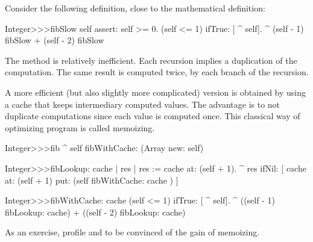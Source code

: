 \documentclass[a4paper,10pt,twoside]{book}
\begin{document}
Consider the following definition, close to the mathematical definition:
\begin{code}{}
Integer>>>fibSlow
	self assert: self >= 0.
	(self <= 1) ifTrue: [ ^ self].
	^ (self - 1) fibSlow + (self - 2) fibSlow
\end{code}

The method  is relatively inefficient. Each recursion implies a duplication of the computation. The same result is computed twice, by each branch of the recursion.

A more efficient (but also slightly more complicated) version is obtained by using a cache that keeps intermediary computed values. The advantage is to not duplicate computations since each value is computed once. This classical way of optimizing program is called memoizing. 
      
\begin{code}{}
Integer>>>fib
	^ self fibWithCache: (Array new: self)

Integer>>>fibLookup: cache
	| res |
	res := cache at: (self + 1).
	^ res ifNil: [ cache at: (self + 1) put:  (self fibWithCache: cache  ) ]

Integer>>>fibWithCache:  cache
	(self <= 1) ifTrue: [ ^ self].
	^ ((self - 1) fibLookup: cache) + ((self - 2) fibLookup: cache)  
\end{code}


As an exercise, profile  and  to be convinced of the gain of memoizing. 


\end{document}
